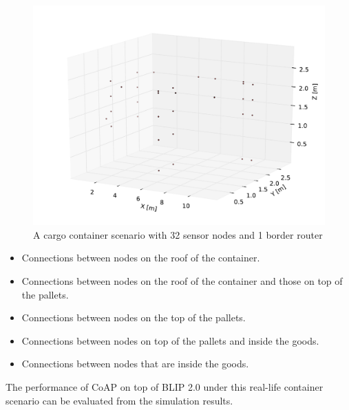 \begin{figure}[htbp]
  \begin{center}
    \leavevmode
      \includegraphics[scale=0.45]
      {Pics/container.pdf}
   \caption{A cargo container scenario with 32 sensor nodes and 1 border router}
    \label{fig:container}
  \end{center}
\end{figure}

\begin{itemize}
\item Connections between nodes on the roof of the container.
\item Connections between nodes on the roof of the container and those on top of the pallets.
\item Connections between nodes on the top of the pallets.
\item Connections between nodes on top of the pallets and inside the goods.
\item Connections between nodes that are inside the goods.
\end{itemize}

The performance of CoAP on top of BLIP 2.0 under this real-life container scenario can be evaluated from the simulation results.


